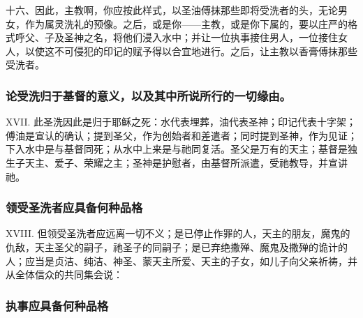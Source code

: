 十六、因此，主教啊，你应按此样式，以圣油傅抹那些即将受洗者的头，无论男女，作为属灵洗礼的预像。之后，或是你——主教，或是你下属的，要以庄严的格式呼父、子及圣神之名，将他们浸入水中；并让一位执事接住男人，一位接住女人，以使这不可侵犯的印记的赋予得以合宜地进行。之后，让主教以香膏傅抹那些受洗者。\par


\subsubsection{论受洗归于基督的意义，以及其中所说所行的一切缘由。}

XVII. 此圣洗因此是归于耶稣之死：水代表埋葬，油代表圣神；印记代表十字架；傅油是宣认的确认；提到圣父，作为创始者和差遣者；同时提到圣神，作为见证；下入水中是与基督同死；从水中上来是与祂同复活。圣父是万有的天主；基督是独生子天主、爱子、荣耀之主；圣神是护慰者，由基督所派遣，受祂教导，并宣讲祂。\par


\subsubsection{领受圣洗者应具备何种品格}

XVIII. 但领受圣洗者应远离一切不义；是已停止作罪的人，天主的朋友，魔鬼的仇敌，天主圣父的嗣子，祂圣子的同嗣子；是已弃绝撒殚、魔鬼及撒殚的诡计的人；应当是贞洁、纯洁、神圣、蒙天主所爱、天主的子女，如儿子向父亲祈祷，并从全体信众的共同集会说：\par


\subsubsection{执事应具备何种品格}


